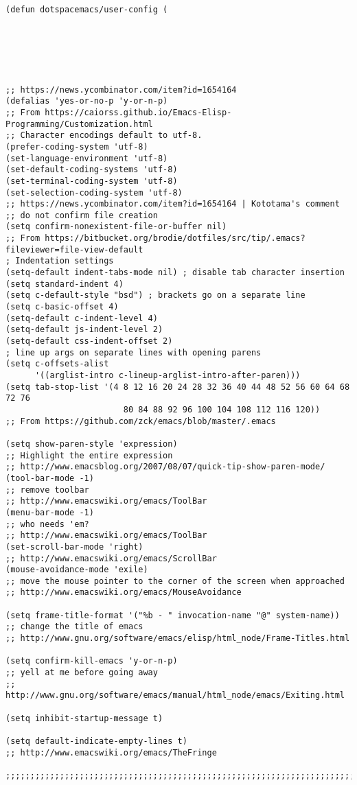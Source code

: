 \documentclass[11pt]{article}
\begin{document}
\begin{verbatim}
(defun dotspacemacs/user-config (






;; https://news.ycombinator.com/item?id=1654164
(defalias 'yes-or-no-p 'y-or-n-p)
;; From https://caiorss.github.io/Emacs-Elisp-Programming/Customization.html
;; Character encodings default to utf-8.
(prefer-coding-system 'utf-8)
(set-language-environment 'utf-8)
(set-default-coding-systems 'utf-8)
(set-terminal-coding-system 'utf-8)
(set-selection-coding-system 'utf-8)
;; https://news.ycombinator.com/item?id=1654164 | Kototama's comment
;; do not confirm file creation
(setq confirm-nonexistent-file-or-buffer nil)
;; From https://bitbucket.org/brodie/dotfiles/src/tip/.emacs?fileviewer=file-view-default
; Indentation settings
(setq-default indent-tabs-mode nil) ; disable tab character insertion
(setq standard-indent 4)
(setq c-default-style "bsd") ; brackets go on a separate line
(setq c-basic-offset 4)
(setq-default c-indent-level 4)
(setq-default js-indent-level 2)
(setq-default css-indent-offset 2)
; line up args on separate lines with opening parens
(setq c-offsets-alist
      '((arglist-intro c-lineup-arglist-intro-after-paren)))
(setq tab-stop-list '(4 8 12 16 20 24 28 32 36 40 44 48 52 56 60 64 68 72 76
                        80 84 88 92 96 100 104 108 112 116 120))
;; From https://github.com/zck/emacs/blob/master/.emacs

(setq show-paren-style 'expression)
;; Highlight the entire expression
;; http://www.emacsblog.org/2007/08/07/quick-tip-show-paren-mode/
(tool-bar-mode -1)
;; remove toolbar
;; http://www.emacswiki.org/emacs/ToolBar
(menu-bar-mode -1)
;; who needs 'em?
;; http://www.emacswiki.org/emacs/ToolBar
(set-scroll-bar-mode 'right)
;; http://www.emacswiki.org/emacs/ScrollBar
(mouse-avoidance-mode 'exile)
;; move the mouse pointer to the corner of the screen when approached
;; http://www.emacswiki.org/emacs/MouseAvoidance

(setq frame-title-format '("%b - " invocation-name "@" system-name))
;; change the title of emacs
;; http://www.gnu.org/software/emacs/elisp/html_node/Frame-Titles.html

(setq confirm-kill-emacs 'y-or-n-p)
;; yell at me before going away
;; http://www.gnu.org/software/emacs/manual/html_node/emacs/Exiting.html

(setq inhibit-startup-message t)

(setq default-indicate-empty-lines t)
;; http://www.emacswiki.org/emacs/TheFringe

;;;;;;;;;;;;;;;;;;;;;;;;;;;;;;;;;;;;;;;;;;;;;;;;;;;;;;;;;;;;;;;;;;;;;;;;;;;;;;;;;;;;;;;;;;;;;;


\end{verbatim}
\end{document}
